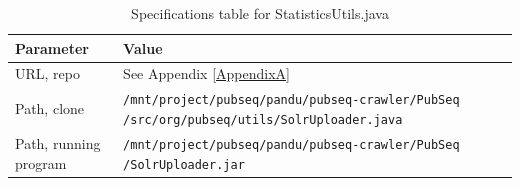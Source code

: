 \begin{table}[htbp]
\caption{Specifications table for StatisticsUtils.java}
\centering
\begin{tabularx}{\textwidth}{ | l | X | }
  \hline
  Parameter & Value \\
  \hline
  URL, repo & See Appendix \ref{AppendixA} \\
  Path, clone & \texttt{/mnt/project/pubseq/pandu/pubseq-crawler/PubSeq /src/org/pubseq/utils/SolrUploader.java} \\
  Path, running program & \texttt{/mnt/project/pubseq/pandu/pubseq-crawler/PubSeq /SolrUploader.jar}\\
  \hline
\end{tabularx}
\end{table}
